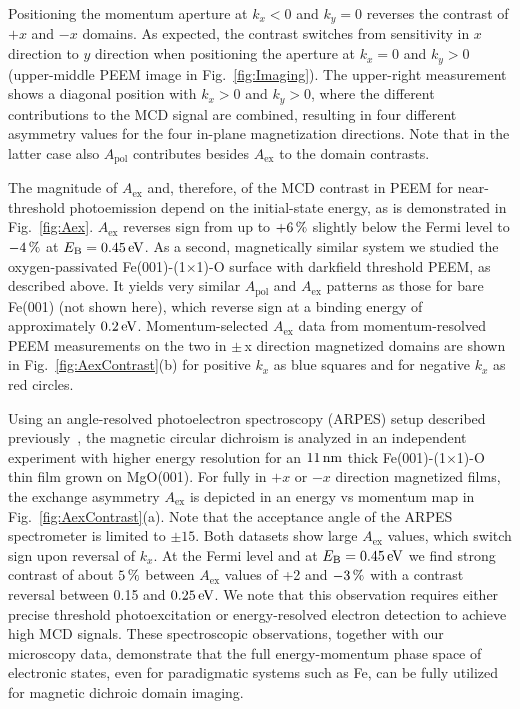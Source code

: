 \documentclass[prl,twocolumn,floatfix,superscriptaddress,aps]{revtex4-2}
\begin{document}
Positioning the momentum aperture at $k_x < 0$ and $k_y = 0$ reverses the contrast of $+x$ and $-x$ domains. As expected, the contrast switches from sensitivity in $x$ direction to $y$ direction when positioning the aperture at $k_x = 0$ and $k_y > 0$ (upper-middle PEEM image in Fig.~\ref{fig:Imaging}). The upper-right measurement shows a diagonal position with $k_x > 0$ and $k_y > 0$, where the different contributions to the MCD signal are combined, resulting in four different asymmetry values for the four in-plane magnetization directions. Note that in the latter case also $A_{\mathrm{pol}}$ contributes besides $A_{\mathrm{ex}}$ to the domain contrasts. 

The magnitude of $A_{\mathrm{ex}}$ and, therefore, of the MCD contrast in PEEM for near-threshold photoemission depend on the initial-state energy, as is demonstrated in Fig.~\ref{fig:Aex}. $A_{\mathrm{ex}}$ reverses sign from up to $\unit[+6]{\%}$ slightly below the Fermi level to $\unit[-4]{\%}$ at $E_{\mathrm{B}} = \unit[0.45]{eV}$. 
As a second, magnetically similar system we studied the oxygen-passivated Fe(001)-(1$\times$1)-O surface with darkfield threshold PEEM, as described above. It yields very similar $A_{\mathrm{pol}}$ and $A_{\mathrm{ex}}$ patterns as those for bare Fe(001) (not shown here), which reverse sign at a binding energy of approximately $\unit[0.2]{eV}$. Momentum-selected $A_{\mathrm{ex}}$ data from momentum-resolved PEEM measurements on 
the two in $\pm$\,x direction magnetized domains are shown in Fig.~\ref{fig:AexContrast}(b) for positive $k_x$ as blue squares and for negative $k_x$ as red circles. 

Using an angle-resolved photoelectron spectroscopy (ARPES) setup described previously~\cite{gillmeister2018, gillmeister2020}, the magnetic circular dichroism is analyzed in an independent experiment with higher energy resolution for an $\unit[11]{nm}$ thick Fe(001)-(1$\times$1)-O thin film grown on MgO(001). For fully in $+x$ or $-x$ direction magnetized films, the exchange asymmetry $A_{\mathrm{ex}}$ is depicted in an energy vs momentum map in Fig.~\ref{fig:AexContrast}(a). Note that the acceptance angle of the ARPES spectrometer is limited to $\pm15$\textdegree. Both datasets show large $A_{\mathrm{ex}}$ values, which switch sign upon reversal of $k_x$. At the Fermi level and at $E_{\mathrm{B}} = \unit[0.45]{eV}$ we find strong contrast of about $\unit[5]{\%}$ between $A_{\mathrm{ex}}$ values of +2 and $\unit[-3]{\%}$ with a contrast reversal between 0.15 and $\unit[0.25]{eV}$. We note that this observation requires either precise threshold photoexcitation or energy-resolved electron detection to achieve high MCD signals.
These spectroscopic observations, together with our microscopy data, demonstrate that the full energy-momentum phase space of electronic states, even for paradigmatic systems such as Fe, can be fully utilized for magnetic dichroic domain imaging.
\end{document}
